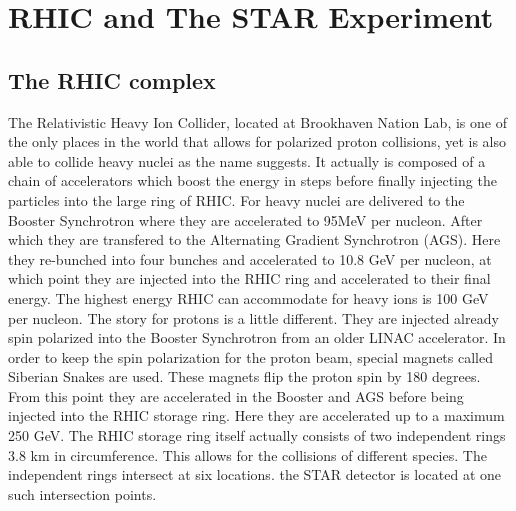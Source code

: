 \documentclass[abstract = on,listof=totoc, bibliography=totoc]{scrreprt}
\begin{document}
\chapter{RHIC and The STAR Experiment}

\section{The RHIC complex}
The Relativistic Heavy Ion Collider, located at Brookhaven Nation Lab, is one of the only places in the world that allows for polarized proton collisions, yet is also able to collide heavy nuclei as the name suggests. It actually is composed of a chain of accelerators which boost the energy in steps before finally injecting the particles into the large ring of RHIC. For heavy nuclei are delivered to the Booster Synchrotron where they are accelerated to 95MeV per nucleon. After which they are transfered to the Alternating Gradient Synchrotron (AGS). Here they re-bunched into four bunches and accelerated to 10.8 GeV per nucleon, at which point they are injected into the RHIC ring and accelerated to their final energy. The highest energy RHIC can accommodate for heavy ions is 100 GeV per nucleon. 
The story for protons is a little different. They are injected already spin polarized into the Booster Synchrotron from an older LINAC accelerator. In order to keep the spin polarization for the proton beam, special magnets called Siberian Snakes are used. These magnets flip the proton spin by 180 degrees. From this point they are accelerated in the Booster and AGS before being injected into the RHIC storage ring. Here they are accelerated up to a maximum 250 GeV. 
The RHIC storage ring itself actually consists of two independent rings 3.8 km in circumference. This allows for the collisions of different species. The independent rings intersect at six locations. the STAR detector is located at one such intersection points\cite{RHICoverview}.
\end{document}
